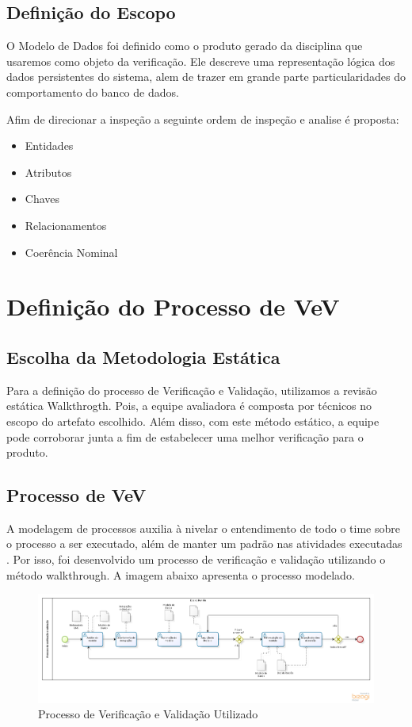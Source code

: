 \subsection{Definição do Escopo}
O Modelo de Dados foi definido como o produto gerado da disciplina que usaremos como objeto da verificação. Ele descreve uma representação lógica dos dados persistentes do sistema, alem de trazer em grande parte particularidades do comportamento do banco de dados.\cite{e04} 

Afim de direcionar a inspeção a seguinte ordem de inspeção e analise é proposta:

\begin{itemize}
\item Entidades
\item Atributos
\item Chaves
\item Relacionamentos
\item Coerência Nominal
\end{itemize}

\section{Definição do Processo de VeV}

\subsection{Escolha da Metodologia Estática}
Para a definição do processo de Verificação e Validação, utilizamos a revisão
estática Walkthrogth. Pois,  a equipe avaliadora é composta por técnicos no escopo
do artefato escolhido. Além disso, com este método estático, a equipe pode corroborar
junta a fim de estabelecer uma melhor verificação para o produto.

\subsection{Processo de VeV}
A modelagem de processos auxilia à nivelar o entendimento de todo o time sobre o processo a ser executado, além de manter 
um padrão nas atividades executadas\cite{romano} . Por isso, foi 
desenvolvido um processo de verificação e validação utilizando o método walkthrough. A imagem abaixo apresenta o processo 
modelado.

\begin{figure}[!h]
\centering
\includegraphics[scale=0.55, angle = 90]{figuras/Processo_vv_walkthrough}
\caption[Processo de Verificação e Validação Utilizado]{Processo de Verificação e Validação Utilizado\footnotemark}
\end{figure}
\FloatBarrier

